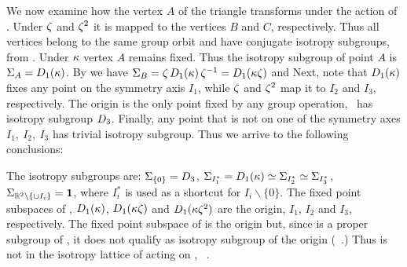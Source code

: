 \begin{example}  %

We now examine how the vertex $A$ of the triangle transforms
under the action of . Under $\zeta$ and $\zeta^2$ it is
mapped to the vertices $B$ and $C$, respectively.
Thus all vertices belong to the same group orbit and have
conjugate isotropy subgroups, from .
Under $\kappa$ vertex $A$ remains fixed. Thus the isotropy
subgroup of point $A$ is $\Sigma_{A}=D_1(\kappa)$. By
 we have $\Sigma_{B}=\zeta\,
D_1(\kappa)\, \zeta^{-1} = D_1(\kappa\zeta)$
and
Next, note that $D_1(\kappa)$ fixes
any point on the symmetry axis $I_1$, while $\zeta$ and
$\zeta^2$ map it to $I_2$ and $I_3$, respectively. The origin
is the only point fixed by any group operation, \ie~has
isotropy subgroup $D_{3}$. Finally, any point that is not on
one of the symmetry axes $I_1,\ I_2,\ I_3$ has trivial isotropy
subgroup. Thus we arrive to the following conclusions:

The isotropy subgroups are: $\Sigma_{\{0\}}=D_{3}$,
$\Sigma_{I_1^*}=D_1(\kappa)\simeq\Sigma_{I_2^*}\simeq\Sigma_{I_3^*}$,
$\Sigma_{\mathbb{R}^{2}\backslash\{\cup I_i\}}=\mathbf{1}$, where $I_i^*$ is
used as a shortcut for $I_i\backslash\{0\}$. The fixed point
subspaces of , $D_1(\kappa)$, $D_1(\kappa\zeta)$ and
$D_1(\kappa\zeta^2)$ are the origin, $I_1$, $I_2$ and $I_3$,
respectively. The fixed point subspace of  is the origin
but, since  is a proper subgroup of , it
does not qualify as isotropy subgroup of the origin
(\cf~.) Thus  is not in the isotropy
lattice of  acting on ,
\cf~.


\end{example}

